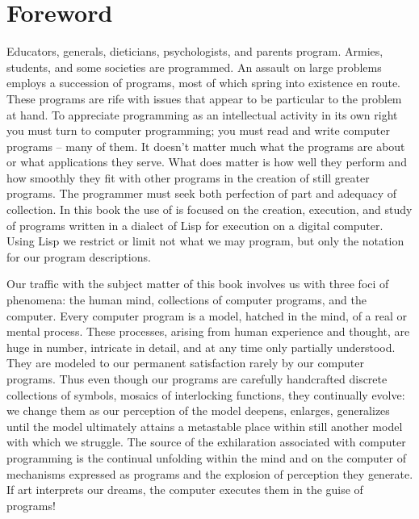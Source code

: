 
\chapter[chap:foreword]{Foreword}

Educators, generals, dieticians, psychologists, and parents program.
Armies, students, and some societies are programmed.
An assault on large problems employs a succession of programs, most of which spring into existence en route.
These programs are rife with issues that appear to be particular to the problem at hand.
To appreciate programming as an intellectual activity in its own right you must turn to computer programming;
you must read and write computer programs -- many of them.
It doesn't matter much what the programs are about or what applications they serve.
What does matter is how well they perform
and how smoothly they fit with other programs in the creation of still greater programs.
The programmer must seek both perfection of part and adequacy of collection.
In this book the use of  is focused on the creation, execution,
and study of programs written in a dialect of Lisp for execution on a digital computer.
Using Lisp we restrict or limit not what we may program, but only the notation for our program descriptions.

Our traffic with the subject matter of this book involves us with three foci of phenomena:
the human mind, collections of computer programs, and the computer.
Every computer program is a model, hatched in the mind, of a real or mental process.
These processes, arising from human experience and thought, are huge in number, intricate in detail,
and at any time only partially understood.
They are modeled to our permanent satisfaction rarely by our computer programs.
Thus even though our programs are carefully handcrafted discrete collections of symbols,
mosaics of interlocking functions, they continually evolve:
we change them as our perception of the model deepens, enlarges, generalizes
until the model ultimately attains a metastable place within still another model with which we struggle.
The source of the exhilaration associated with computer programming is the continual unfolding within the mind
and on the computer of mechanisms expressed as programs and the explosion of perception they generate.
If art interprets our dreams, the computer executes them in the guise of programs!

